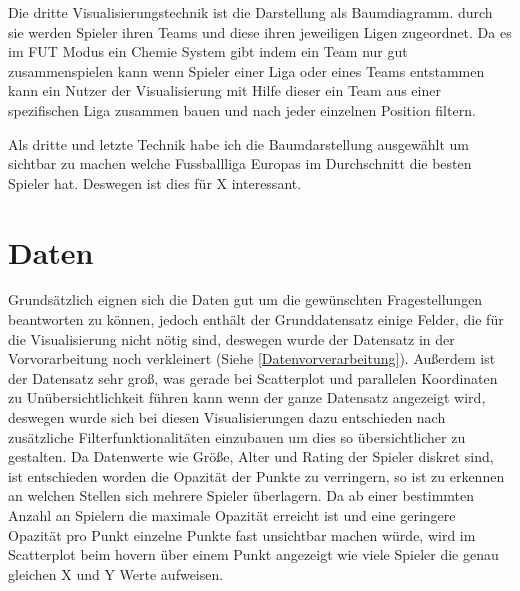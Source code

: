\documentclass[usegeometry=true]{scrartcl}
\begin{document}
Die dritte Visualisierungstechnik ist die Darstellung als Baumdiagramm. durch sie werden Spieler ihren Teams und diese ihren jeweiligen Ligen zugeordnet. Da es im FUT Modus ein Chemie System gibt indem ein Team nur gut zusammenspielen kann wenn Spieler einer Liga oder eines Teams entstammen kann ein Nutzer der Visualisierung mit Hilfe dieser ein Team aus einer spezifischen Liga zusammen bauen und nach jeder einzelnen Position filtern\cite{heib_fifa_2021}.



Als dritte und letzte Technik habe ich die Baumdarstellung ausgewählt um sichtbar zu machen welche Fussballliga Europas im Durchschnitt die besten Spieler hat. Deswegen ist dies für X interessant.\\

\section{Daten}


Grundsätzlich eignen sich die Daten gut um die gewünschten Fragestellungen beantworten zu können, jedoch enthält der Grunddatensatz einige Felder, die für die Visualisierung nicht nötig sind, deswegen wurde der Datensatz in der Vorvorarbeitung noch verkleinert (Siehe \ref{Datenvorverarbeitung}). Außerdem ist der Datensatz sehr groß, was gerade bei Scatterplot und parallelen Koordinaten zu Unübersichtlichkeit führen kann wenn der ganze Datensatz angezeigt wird, deswegen wurde sich bei diesen Visualisierungen dazu entschieden nach zusätzliche Filterfunktionalitäten einzubauen um dies so übersichtlicher zu gestalten. Da Datenwerte wie Größe, Alter und Rating der Spieler diskret sind, ist entschieden worden die Opazität der Punkte zu verringern, so ist zu erkennen an welchen Stellen sich mehrere Spieler überlagern. Da ab einer bestimmten Anzahl an Spielern die maximale Opazität erreicht ist und eine geringere Opazität pro Punkt einzelne Punkte fast unsichtbar machen würde, wird im Scatterplot beim hovern über einem Punkt angezeigt wie viele Spieler die genau gleichen  X und Y Werte aufweisen.
\end{document}
